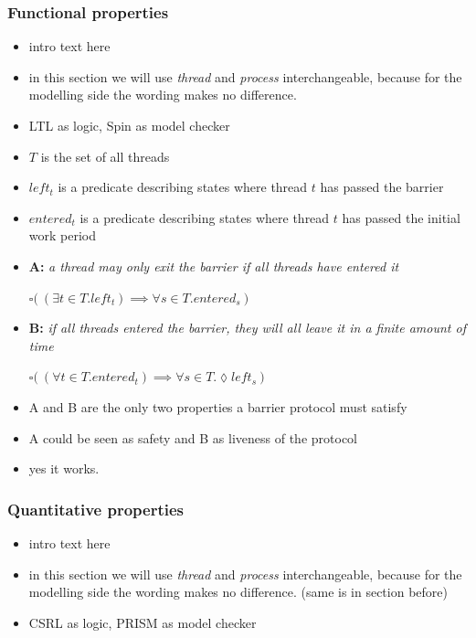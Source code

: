 \documentclass[a4paper, 10pt]{article}
\begin{document}
\begin{enumerate}
\subsubsection{Functional properties}
\label{sssec:analysis-modelchecking-functional-properties}
\begin{itemize}
	\item intro text here
	\item in this section we will use \emph{thread} and \emph{process} interchangeable, because for the modelling side the wording makes no difference.
	\item LTL as logic, Spin as model checker
	\item $T$ is the set of all threads
	\item $left_t$ is a predicate describing states where thread $t$ has passed the barrier
	\item $entered_t$ is a predicate describing states where thread $t$ has passed the initial work period
	\item \textbf{A:} \emph{a thread may only exit the barrier if all threads have entered it}
		\begin{center}
			$\square \big( ~ ( \exists t \in T . \mathit{left_t} ) \implies \forall s \in T. \mathit{entered_s} ~ \big)$
		\end{center}
	\item \textbf{B:} \emph{if all threads entered the barrier, they will all leave it in a finite amount of time}
		\begin{center}
			$\square \big( ~(\forall t \in T . \mathit{entered_t} ) \implies \forall s \in T. \lozenge \mathit{left_s} ~ \big)$
		\end{center}
	\item A and B are the only two properties a barrier protocol must satisfy
	\item A could be seen as safety and B as liveness of the protocol
	\item yes it works.
\end{itemize}

\subsubsection{Quantitative properties}
\label{sssec:analysis-modelchecking-quantitative-properties}
\begin{itemize}
	\item intro text here
	\item in this section we will use \emph{thread} and \emph{process} interchangeable, because for the modelling side the wording makes no difference. (same is in section before)
	\item CSRL as logic, PRISM as model checker
\end{itemize}


\end{enumerate}
\end{document}

